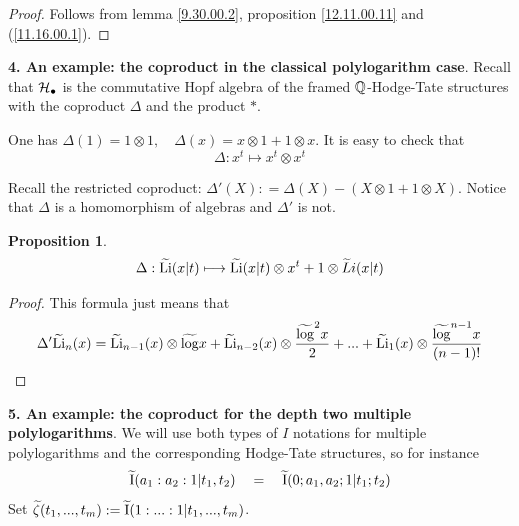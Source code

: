 \documentclass[10pt]{article}
\newtheorem{proposition}[theorem]{Proposition}
\begin{document}
\begin{proof} Follows from lemma \ref{9.30.00.2}, 
proposition \ref{12.11.00.11} and (\ref{11.16.00.1}). 


\end{proof}

{\bf 4. An example: the coproduct in the classical polylogarithm case}. 
Recall that ${\cal H}_{\bullet}$ is the commutative 
Hopf algebra of the framed ${\mathbb Q}$-Hodge-Tate structures with the coproduct $\Delta$ and the product $\ast$. 

One has $\Delta(1) = 1 \otimes 1, \quad \Delta(x) = 
x \otimes 1 +  1 \otimes x$. 
It is easy to check that 
\begin{equation} \label{d0f}
\Delta: x^t \longmapsto  x^t\otimes x^t
\end{equation}


Recall 
the restricted coproduct: $\Delta'(X): = \Delta(X)
- (X\otimes 1 + 1\otimes X)$. Notice that $\Delta$ is a
homomorphism of algebras and $\Delta'$ is not.


\begin{proposition}  \label{9.30.00.1}
\begin{equation} \label{d1f}
\Delta: {\widetilde {\rm Li}}(x|t) \longmapsto {\widetilde {\rm Li}}(x|t
)\otimes x^{t} + 1 \otimes \widetilde   Li(x|t)
\end{equation}
\end{proposition}

\begin{proof} 
This formula just means that 
$$
\Delta' {\widetilde {\rm Li}}_n(x) = {\widetilde {\rm Li}}_{n-1}(x) \otimes \widetilde \log x + {\widetilde {\rm Li}}_{n-2}(x) \otimes \frac{\widetilde \log^2 x}{2} + ... + {\widetilde {\rm Li}}_{1}(x) \otimes \frac{\widetilde \log^{n-1} x}{(n-1)!}
$$


\end{proof}

{\bf 5. An example: the coproduct for the depth two
 multiple polylogarithms}. 
We will use both types of $I$ notations for multiple polylogarithms and the corresponding 
Hodge-Tate structures, so for instance 
$$
\widetilde {\rm I}(a_1:a_2:1|t_1,t_2) \quad = \quad 
\widetilde {\rm I}(0; a_1, a_2; 1|t_1;t_2)
$$ 
Set $\widetilde \zeta(t_1, ..., t_m) := \widetilde {\rm I}(1: ... : 1 | t_1, ..., t_m)$.
\end{document}
